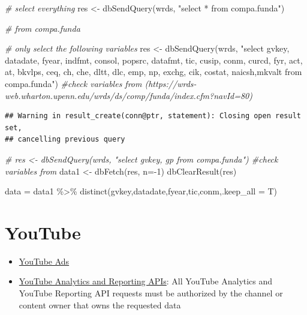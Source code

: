 \documentclass[
]{book}
\newenvironment{Shaded}{\begin{snugshade}}{\end{snugshade}}
\newcommand{\AttributeTok}[1]{\textcolor[rgb]{0.77,0.63,0.00}{#1}}
\newcommand{\CommentTok}[1]{\textcolor[rgb]{0.56,0.35,0.01}{\textit{#1}}}
\newcommand{\DecValTok}[1]{\textcolor[rgb]{0.00,0.00,0.81}{#1}}
\newcommand{\FunctionTok}[1]{\textcolor[rgb]{0.00,0.00,0.00}{#1}}
\newcommand{\NormalTok}[1]{#1}
\newcommand{\OtherTok}[1]{\textcolor[rgb]{0.56,0.35,0.01}{#1}}
\newcommand{\SpecialCharTok}[1]{\textcolor[rgb]{0.00,0.00,0.00}{#1}}
\newcommand{\StringTok}[1]{\textcolor[rgb]{0.31,0.60,0.02}{#1}}
\providecommand{\tightlist}{%
  \setlength{\itemsep}{0pt}\setlength{\parskip}{0pt}}
\begin{document}
\begin{Shaded}
\begin{Highlighting}[]
\CommentTok{\# select everything}
\NormalTok{res }\OtherTok{\textless{}{-}} \FunctionTok{dbSendQuery}\NormalTok{(wrds, }\StringTok{"select * from compa.funda"}\NormalTok{)}

\CommentTok{\# from compa.funda}

\CommentTok{\# only select the following variables}
\NormalTok{res }\OtherTok{\textless{}{-}} \FunctionTok{dbSendQuery}\NormalTok{(wrds, }\StringTok{"select gvkey, datadate, fyear, indfmt, consol, popsrc, datafmt, tic, cusip, conm, curcd, fyr, act, at, bkvlps, ceq, ch, che, dltt, dlc, emp, np, exchg, cik, costat, naicsh,mkvalt from compa.funda"}\NormalTok{) }\CommentTok{\#check variables from (https://wrds{-}web.wharton.upenn.edu/wrds/ds/comp/funda/index.cfm?navId=80)}
\end{Highlighting}
\end{Shaded}

\begin{verbatim}
## Warning in result_create(conn@ptr, statement): Closing open result set,
## cancelling previous query
\end{verbatim}

\begin{Shaded}
\begin{Highlighting}[]
\CommentTok{\# res \textless{}{-} dbSendQuery(wrds, "select gvkey, gp from compa.funda") \#check variables from}
\NormalTok{data1 }\OtherTok{\textless{}{-}} \FunctionTok{dbFetch}\NormalTok{(res, }\AttributeTok{n=}\SpecialCharTok{{-}}\DecValTok{1}\NormalTok{)}
\FunctionTok{dbClearResult}\NormalTok{(res)}

\NormalTok{data }\OtherTok{=}\NormalTok{ data1 }\SpecialCharTok{\%\textgreater{}\%}
    \FunctionTok{distinct}\NormalTok{(gvkey,datadate,fyear,tic,conm,}\AttributeTok{.keep\_all =}\NormalTok{ T)}
\end{Highlighting}
\end{Shaded}

\hypertarget{youtube}{%
\section{YouTube}\label{youtube}}

\begin{itemize}
\tightlist
\item
  \href{https://www.youtube.com/intl/en_us/ads/how-it-works/measure-your-results/}{YouTube Ads}\\
\item
  \href{https://developers.google.com/youtube/reporting}{YouTube Analytics and Reporting APIs}: All YouTube Analytics and
  YouTube Reporting API requests must be authorized by the channel or content owner that owns the requested data
\end{itemize}
\end{document}
